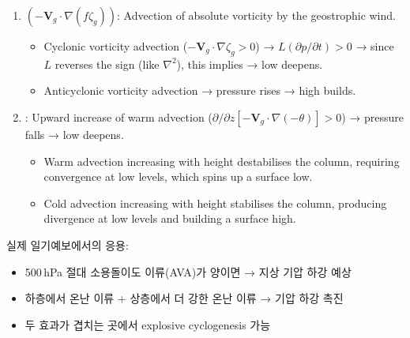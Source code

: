\begin{remark}
\begin{enumerate}
  \item {} $(-\mathbf{V}_g\cdot\nabla(f\zeta_g))$:
        Advection of absolute vorticity by the geostrophic wind.
        \begin{itemize}
          \item Cyclonic vorticity advection ($-\mathbf{V}_g\cdot\nabla\zeta_g > 0$)
                → $L(\partial p/\partial t) > 0$ → since $L$ reverses the sign
                (like $\nabla^2$), this implies 
                → low deepens.
          \item Anticyclonic vorticity advection → pressure rises → high builds.
        \end{itemize}
  \item {}:
        Upward increase of warm advection
        ($\partial/\partial z[{-\mathbf{V}_g\cdot\nabla(-\theta)}] > 0$)
        → pressure falls → low deepens.
        \begin{itemize}
          \item Warm advection increasing with height destabilises the column,
                requiring convergence at low levels, which spins up a surface low.
          \item Cold advection increasing with height stabilises the column,
                producing divergence at low levels and building a surface high.
        \end{itemize}
\end{enumerate}
\end{remark}


\begin{hisublock}
실제 일기예보에서의 응용:
\begin{itemize}
  \item 500\,hPa 절대 소용돌이도 이류(AVA)가 양이면 → 지상 기압 하강 예상
  \item 하층에서 온난 이류 + 상층에서 더 강한 온난 이류 → 기압 하강 촉진
  \item 두 효과가 겹치는 곳에서 explosive cyclogenesis 가능
\end{itemize}
\end{hisublock}

